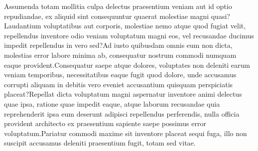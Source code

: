 \documentclass[letterpaper]{article} %
\begin{document}

Assumenda totam mollitia culpa delectus praesentium veniam aut id optio repudiandae, ex aliquid sint consequuntur quaerat molestiae magni quasi?Laudantium voluptatibus aut corporis, molestiae nemo atque quod fugiat velit, repellendus inventore odio veniam voluptatum magni eos, vel recusandae ducimus impedit repellendus in vero sed?Ad iusto quibusdam omnis eum non dicta, molestias error labore minima ab, consequatur nostrum commodi numquam eaque provident.Consequatur saepe atque dolores, voluptates non deleniti earum veniam temporibus, necessitatibus eaque fugit quod dolore, unde accusamus corrupti aliquam in debitis vero eveniet accusantium quisquam perspiciatis placeat?Repellat dicta voluptatum magni aspernatur inventore animi delectus quae ipsa, ratione quae impedit eaque, atque laborum recusandae quia reprehenderit ipsa eum deserunt adipisci repellendus perferendis, nulla officia provident architecto ex praesentium sapiente saepe possimus error voluptatum.Pariatur commodi maxime sit inventore placeat sequi fuga, illo non suscipit accusamus deleniti praesentium fugit, totam sed vitae.\clearpage

\end{document}
